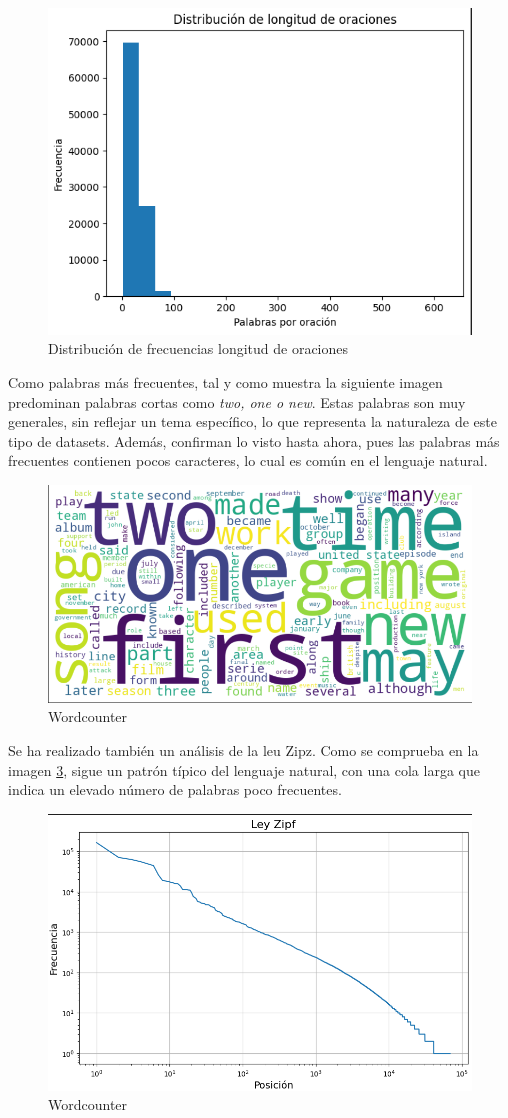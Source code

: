 \documentclass[11pt]{book}
\begin{document}
\begin{figure}[h]
    \centering
    \includegraphics[width=0.5\linewidth]{img/hist_long_s_wiki.png}
    \caption{Distribución de frecuencias longitud de oraciones}
    \label{fig:placeholder41}
\end{figure}

Como palabras más frecuentes, tal y como muestra la siguiente imagen predominan palabras cortas como \textit{two, one o new}. Estas palabras son muy generales, sin reflejar un tema específico, lo que representa la naturaleza de este tipo de datasets. Además, confirman lo visto hasta ahora, pues las palabras más frecuentes contienen pocos caracteres, lo cual es común en el lenguaje natural.

\begin{figure}[h]
    \centering
    \includegraphics[width=0.5\linewidth]{img/word_count_wiki.png}
    \caption{Wordcounter}
    \label{fig:placeholder39}
\end{figure}

Se ha realizado también un análisis de la leu Zipz. Como se comprueba en la imagen \ref{fig:placeholder42}, sigue un patrón típico del lenguaje natural, con una cola larga que indica un elevado número de palabras poco frecuentes.
\begin{figure}[h]

    \centering
    \includegraphics[width=0.5\linewidth]{img/zipz_wiki.png}
    \caption{Wordcounter}
    \label{fig:placeholder42}
\end{figure}
\end{document}
